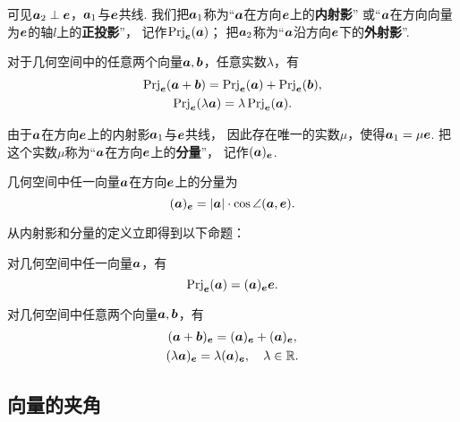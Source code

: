 可见\(\boldsymbol{a}_2 \perp \boldsymbol{e}\)，\(\boldsymbol{a}_1\)与\(\boldsymbol{e}\)共线.
我们把\(\boldsymbol{a}_1\)称为“\(\boldsymbol{a}\)在方向\(\boldsymbol{e}\)上的\textbf{内射影}”
或“\(\boldsymbol{a}\)在方向向量为\(\boldsymbol{e}\)的轴\(l\)上的\textbf{正投影}”，
记作\(\operatorname{Prj}_{\boldsymbol{e}}(\boldsymbol{a})\)；
把\(\boldsymbol{a}_2\)称为“\(\boldsymbol{a}\)沿方向\(\boldsymbol{e}\)下的\textbf{外射影}”.

\begin{theorem}
对于几何空间中的任意两个向量\(\boldsymbol{a},\boldsymbol{b}\)，任意实数\(\lambda\)，有\begin{gather}
	\operatorname{Prj}_{\boldsymbol{e}}(\boldsymbol{a}+\boldsymbol{b})
	= \operatorname{Prj}_{\boldsymbol{e}}(\boldsymbol{a})
	+ \operatorname{Prj}_{\boldsymbol{e}}(\boldsymbol{b}), \\
	\operatorname{Prj}_{\boldsymbol{e}}(\lambda \boldsymbol{a})
	= \lambda \operatorname{Prj}_{\boldsymbol{e}}(\boldsymbol{a}).
\end{gather}
\end{theorem}

由于\(\boldsymbol{a}\)在方向\(\boldsymbol{e}\)上的内射影\(\boldsymbol{a}_1\)与\(\boldsymbol{e}\)共线，
因此存在唯一的实数\(\mu\)，使得\(\boldsymbol{a}_1 = \mu \boldsymbol{e}\).
把这个实数\(\mu\)称为“\(\boldsymbol{a}\)在方向\(\boldsymbol{e}\)上的\textbf{分量}”，
记作\((\boldsymbol{a})_{\boldsymbol{e}}\).

\begin{theorem}
几何空间中任一向量\(\boldsymbol{a}\)在方向\(\boldsymbol{e}\)上的分量为\begin{equation}
	(\boldsymbol{a})_{\boldsymbol{e}}
	= \abs{\boldsymbol{a}} \cdot \cos\angle(\boldsymbol{a},\boldsymbol{e}).
\end{equation}
\end{theorem}

从内射影和分量的定义立即得到以下命题：
\begin{theorem}
对几何空间中任一向量\(\boldsymbol{a}\)，有\[
	\operatorname{Prj}_{\boldsymbol{e}}(\boldsymbol{a})
	= (\boldsymbol{a})_{\boldsymbol{e}} \boldsymbol{e}.
\]
\end{theorem}

\begin{theorem}
对几何空间中任意两个向量\(\boldsymbol{a},\boldsymbol{b}\)，有\begin{gather}
	(\boldsymbol{a}+\boldsymbol{b})_{\boldsymbol{e}}
	= (\boldsymbol{a})_{\boldsymbol{e}}
	+ (\boldsymbol{a})_{\boldsymbol{e}}, \\
	(\lambda \boldsymbol{a})_{\boldsymbol{e}}
	= \lambda (\boldsymbol{a})_{\boldsymbol{e}},
	\quad\lambda\in\mathbb{R}.
\end{gather}
\end{theorem}

\subsection{向量的夹角}

